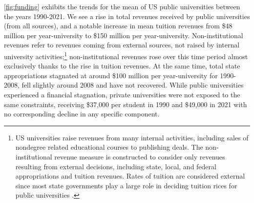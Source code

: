 \documentclass[notitlepage,12pt]{article}
\begin{document}
\autoref{fig:funding} exhibits the trends for the mean of US public universities between the years 1990-2021.
We see a rise in total revenues received by public universities (from all sources), and a notable increase in mean tuition revenues from \$48 million per year-university to \$150 million per year-university. 
Non-institutional revenues refer to revenues coming from external sources, not raised by internal university activities;\footnote{
    US universities raise revenues from many internal activities, including sales of nondegree related educational courses to publishing deals.
    The non-institutional revenue measure is constructed to consider only revenues resulting from external decisions, including state, local, and federal appropriations and tuition revenues.
    Rates of tuition are considered external since most state governments play a large role in deciding tuition rices for public universities \citep{NBERw23736}.
}
non-institutional revenues rose over this time period almost exclusively thanks to the rise in tuition revenues.
At the same time, total state appropriations stagnated at around \$100 million per year-university for 1990-2008, fell slightly around 2008 and have not recovered.
While public universities experienced a financial stagnation, private universities were not exposed to the same constraints, receiving \$37,000 per student in 1990 and \$49,000 in 2021 with no corresponding decline in any specific component.
\end{document}

